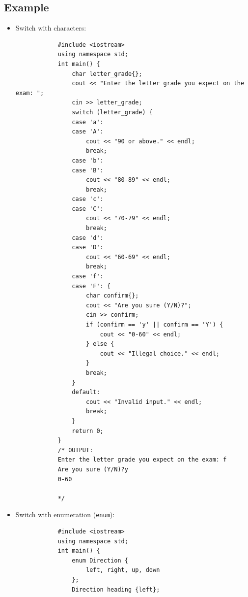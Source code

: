 \subsection{Example}
\begin{itemize}
    \item Switch with characters: 
        \begin{verbatim}
            #include <iostream>
            using namespace std;
            int main() {
                char letter_grade{};
                cout << "Enter the letter grade you expect on the exam: ";
                cin >> letter_grade;
                switch (letter_grade) {
                case 'a':
                case 'A':
                    cout << "90 or above." << endl;
                    break;
                case 'b':
                case 'B':
                    cout << "80-89" << endl;
                    break;
                case 'c':
                case 'C':
                    cout << "70-79" << endl;
                    break;
                case 'd':
                case 'D':
                    cout << "60-69" << endl;
                    break;
                case 'f':
                case 'F': {
                    char confirm{};
                    cout << "Are you sure (Y/N)?";
                    cin >> confirm;
                    if (confirm == 'y' || confirm == 'Y') {
                        cout << "0-60" << endl;
                    } else {
                        cout << "Illegal choice." << endl;
                    }
                    break;
                }
                default:
                    cout << "Invalid input." << endl;
                    break;
                }
                return 0;
            }
            /* OUTPUT:
            Enter the letter grade you expect on the exam: f
            Are you sure (Y/N)?y
            0-60

            */
        \end{verbatim}
    
    \item Switch with enumeration (\texttt{enum}):
        \begin{verbatim}
            #include <iostream>
            using namespace std;
            int main() {
                enum Direction {
                    left, right, up, down
                };
                Direction heading {left};


\end{verbatim}
\end{itemize}

